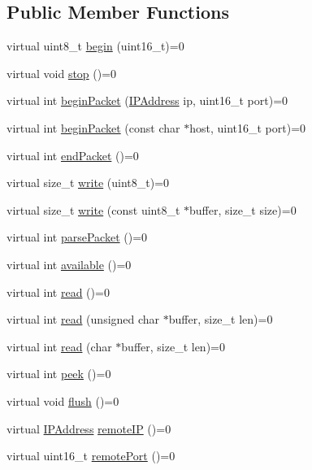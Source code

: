\subsection*{Public Member Functions}
\begin{DoxyCompactItemize}
\item 
virtual uint8\+\_\+t \hyperlink{class_u_d_p_aff8ceabeed84b50fd4eb7983c840b884}{begin} (uint16\+\_\+t)=0
\item 
virtual void \hyperlink{class_u_d_p_a0efff8623a2fb79dad94a96dcf16d966}{stop} ()=0
\item 
virtual int \hyperlink{class_u_d_p_aca9cf7ebfd153f44bfad5b912f44f5ca}{begin\+Packet} (\hyperlink{class_i_p_address}{I\+P\+Address} ip, uint16\+\_\+t port)=0
\item 
virtual int \hyperlink{class_u_d_p_a4a10e98e9ab6f30d132d5f42367bc780}{begin\+Packet} (const char $\ast$host, uint16\+\_\+t port)=0
\item 
virtual int \hyperlink{class_u_d_p_a25f2388b1c8e90cf5ada1141c9c13dfb}{end\+Packet} ()=0
\item 
virtual size\+\_\+t \hyperlink{class_u_d_p_acde4db2f92186810af3493fd2c7535f0}{write} (uint8\+\_\+t)=0
\item 
virtual size\+\_\+t \hyperlink{class_u_d_p_acd93fd9e345711179a5a2af3d46b8b81}{write} (const uint8\+\_\+t $\ast$buffer, size\+\_\+t size)=0
\item 
virtual int \hyperlink{class_u_d_p_a581c4bc112e7598a08a79c322e2c038f}{parse\+Packet} ()=0
\item 
virtual int \hyperlink{class_u_d_p_aebd60457902debb30b07971a16f24ebd}{available} ()=0
\item 
virtual int \hyperlink{class_u_d_p_a4afd50731ba321d1b9be909cb288a50b}{read} ()=0
\item 
virtual int \hyperlink{class_u_d_p_aedff3228c247ac7796279327ee01dc1d}{read} (unsigned char $\ast$buffer, size\+\_\+t len)=0
\item 
virtual int \hyperlink{class_u_d_p_aa421394ec911a19c0f8efc0d755ef1b5}{read} (char $\ast$buffer, size\+\_\+t len)=0
\item 
virtual int \hyperlink{class_u_d_p_a9ae768d427519818aa552adf467bf65a}{peek} ()=0
\item 
virtual void \hyperlink{class_u_d_p_a50ab71f4bc571f6e246b20db4b3dd131}{flush} ()=0
\item 
virtual \hyperlink{class_i_p_address}{I\+P\+Address} \hyperlink{class_u_d_p_a9d197907389705fb5e21591f00126782}{remote\+I\+P} ()=0
\item 
virtual uint16\+\_\+t \hyperlink{class_u_d_p_a37084594eca1dabcf5cfd41941aef423}{remote\+Port} ()=0
\end{DoxyCompactItemize}
